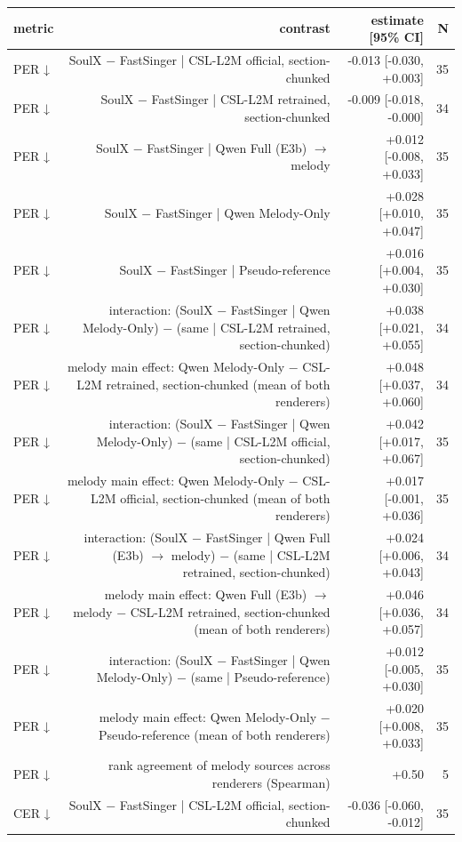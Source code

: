 \begin{table}[t]
\centering
\small
\begin{tabular}{lrrr}
\toprule
metric & contrast & estimate [95\% CI] & N \\
\midrule
PER ↓ & SoulX $-$ FastSinger | CSL-L2M official, section-chunked & -0.013 [-0.030, +0.003] & 35 \\
PER ↓ & SoulX $-$ FastSinger | CSL-L2M retrained, section-chunked & -0.009 [-0.018, -0.000] & 34 \\
PER ↓ & SoulX $-$ FastSinger | Qwen Full (E3b) $\rightarrow$ melody & +0.012 [-0.008, +0.033] & 35 \\
PER ↓ & SoulX $-$ FastSinger | Qwen Melody-Only & +0.028 [+0.010, +0.047] & 35 \\
PER ↓ & SoulX $-$ FastSinger | Pseudo-reference & +0.016 [+0.004, +0.030] & 35 \\
PER ↓ & interaction: (SoulX $-$ FastSinger | Qwen Melody-Only) $-$ (same | CSL-L2M retrained, section-chunked) & +0.038 [+0.021, +0.055] & 34 \\
PER ↓ & melody main effect: Qwen Melody-Only $-$ CSL-L2M retrained, section-chunked (mean of both renderers) & +0.048 [+0.037, +0.060] & 34 \\
PER ↓ & interaction: (SoulX $-$ FastSinger | Qwen Melody-Only) $-$ (same | CSL-L2M official, section-chunked) & +0.042 [+0.017, +0.067] & 35 \\
PER ↓ & melody main effect: Qwen Melody-Only $-$ CSL-L2M official, section-chunked (mean of both renderers) & +0.017 [-0.001, +0.036] & 35 \\
PER ↓ & interaction: (SoulX $-$ FastSinger | Qwen Full (E3b) $\rightarrow$ melody) $-$ (same | CSL-L2M retrained, section-chunked) & +0.024 [+0.006, +0.043] & 34 \\
PER ↓ & melody main effect: Qwen Full (E3b) $\rightarrow$ melody $-$ CSL-L2M retrained, section-chunked (mean of both renderers) & +0.046 [+0.036, +0.057] & 34 \\
PER ↓ & interaction: (SoulX $-$ FastSinger | Qwen Melody-Only) $-$ (same | Pseudo-reference) & +0.012 [-0.005, +0.030] & 35 \\
PER ↓ & melody main effect: Qwen Melody-Only $-$ Pseudo-reference (mean of both renderers) & +0.020 [+0.008, +0.033] & 35 \\
PER ↓ & rank agreement of melody sources across renderers (Spearman) & +0.50 & 5 \\
CER ↓ & SoulX $-$ FastSinger | CSL-L2M official, section-chunked & -0.036 [-0.060, -0.012] & 35 \\

\end{tabular}
\end{table}
